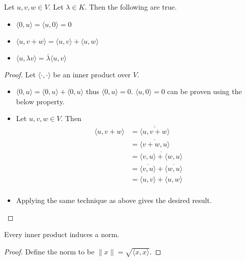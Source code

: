 \documentclass[a4paper]{article}
\begin{document}
\begin{prp}{}{} Let $u,v,w\in V$. Let $\lambda\in K$. Then the following are true. 
\begin{itemize}
\item $\langle 0,u\rangle=\langle u,0\rangle=0$
\item $\langle u,v+w\rangle=\langle u,v\rangle+\langle u,w\rangle$
\item $\langle u,\lambda v\rangle=\overline{\lambda}\langle u,v\rangle$
\end{itemize}\tcbline
\begin{proof} Let $\langle \cdot,\cdot\rangle$ be an inner product over $V$. 
\begin{itemize}
\item $\langle 0,u\rangle=\langle 0,u\rangle+\langle 0,u\rangle$ thus $\langle 0,u\rangle=0$. $\langle u,0\rangle=0$ can be proven using the below property. 
\item Let $u,v,w\in V$. Then 
\begin{align*}
\langle u,v+w\rangle&=\overline{\overline{\langle u,v+w\rangle}}\\
&=\overline{\langle v+w,u\rangle}\\
&=\overline{\langle v,u\rangle+\langle w,u\rangle}\\
&=\overline{\langle v,u\rangle}+\overline{\langle w,u\rangle}\\
&=\langle u,v\rangle+\langle u,w\rangle\\
\end{align*}
\item Applying the same technique as above gives the desired result. 
\end{itemize}
\end{proof}
\end{prp}

\begin{prp}{}{} Every inner product induces a norm. \tcbline
\begin{proof} Define the norm to be $\|x\|=\sqrt{\langle x,x\rangle}$. 
\end{proof}
\end{prp}
\end{document}
